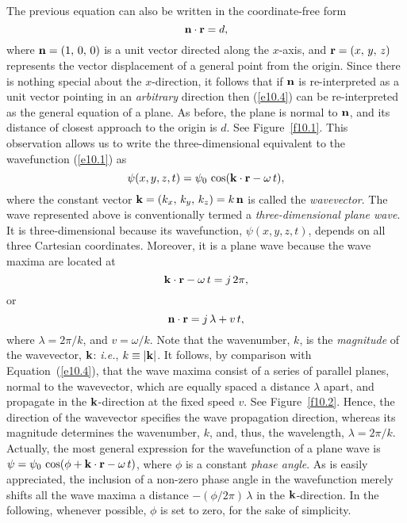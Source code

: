 The previous equation can also be written in the coordinate-free form
\begin{equation}\label{e10.4}
 {\bf n}\cdot{\bf r} = d,
\end{equation}
where  ${\bf n} = (1,\,0,\,0)$ is a unit
vector directed along the $x$-axis, and ${\bf r}=(x,\,y,\,z)$ represents the vector displacement of a general point from the origin. Since there is nothing special about the $x$-direction, it follows that if ${\bf n}$ is re-interpreted as a 
unit vector pointing in an {\em arbitrary}\/ direction then (\ref{e10.4}) can be re-interpreted as the general equation of a plane.
As before, the plane is normal to
${\bf n}$, and its distance of closest approach to the origin is $d$. See Figure~\ref{f10.1}. This observation allows us to write the three-dimensional
equivalent to the wavefunction (\ref{e10.1}) as
\begin{equation}\label{e10.5}
\psi(x,y,z,t)=\psi_0\,\cos({\bf k}\cdot{\bf r}-\omega\,t),
\end{equation}
where the constant vector ${\bf k} = (k_x,\,k_y,\,k_z)=k\,{\bf n}$ is called the {\em wavevector}. The  wave represented above is conventionally termed 
a {\em three-dimensional plane wave}. It is three-dimensio\-nal because its  wavefunction, $\psi(x,y,z,t)$, depends on all
three Cartesian coordinates. Moreover, it is a plane wave because the wave maxima are located at
\begin{equation}
{\bf k}\cdot{\bf r} -\omega\,t = j\,2\pi,
\end{equation}
or
\begin{equation}
{\bf n}\cdot{\bf r} = j\,\lambda + v\,t,
\end{equation}
where  $\lambda=2\pi/k$,   and $v=\omega/k$. Note that the wavenumber, $k$, is the
{\em magnitude}\/ of the wavevector, ${\bf k}$: {\em i.e.}, $k\equiv |{\bf k}|$. 
It follows, by comparison with Equation~(\ref{e10.4}), that the
wave maxima consist of a series of parallel planes,  normal to the wavevector, which are equally spaced a distance $\lambda$ apart, and propagate in the ${\bf k}$-direction  at the fixed speed $v$. See Figure~\ref{f10.2}. Hence, the direction of the wavevector specifies the  wave propagation direction, whereas its magnitude  determines the wavenumber, $k$, and, thus, the wavelength, $\lambda=2\pi/k$. 
Actually, the most general expression for the wavefunction of a  plane wave is $\psi = \psi_0\,\cos(\phi+{\bf k}\cdot{\bf r}-\omega\,t)$, where
$\phi$ is a constant {\em phase angle}. As is easily appreciated, the inclusion  of a non-zero phase angle in the wavefunction
merely shifts all the wave maxima a distance $-(\phi/2\pi)\,\lambda$  in the ${\bf k}$-direction. In the following, whenever possible, $\phi$ is
set to zero, for the sake of simplicity. 

